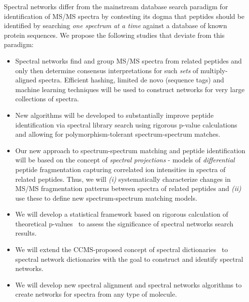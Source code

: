 \documentclass[arial,11pt]{article}
\begin{document}
Spectral networks differ from the mainstream database search paradigm for identification of MS/MS spectra by contesting its dogma that peptides should be identified by searching {\em one spectrum at a time} against a database of known protein sequences. We propose the following studies that deviate from this paradigm:
\begin{itemize}
%
\item Spectral networks find and group MS/MS spectra from related peptides and only then determine consensus interpretations for such {\em sets} of multiply-aligned spectra. Efficient hashing, limited de novo (sequence tags) and machine learning techniques will be used to construct networks for very large collections of spectra.
%
\item New algorithms will be developed to substantially improve peptide identification via spectral library search using rigorous p-value calculations and allowing for polymorphism-tolerant spectrum-spectrum matches.
%
\item Our  new approach to spectrum-spectrum matching and peptide identification will be based on the concept of {\em spectral projections} - models of {\em differential} peptide fragmentation capturing correlated ion intensities in spectra of related peptides. Thus, we will {\em(i)} systematically characterize changes in MS/MS fragmentation patterns between spectra of related peptides and {\em(ii)} use these to define new spectrum-spectrum matching models.
%
\item We will develop a statistical framework based on rigorous calculation of theoretical p-values~\cite{kim08,gupta11}  to assess the significance of spectral networks search results.
%
\item We will extend the CCMS-proposed concept of spectral dictionaries~\cite{kim09msdict} to spectral network dictionaries with the goal to construct and identify spectral networks.
%
\item We will develop new spectral alignment and spectral networks algorithms to create networks for spectra from any type of molecule.
\end{itemize}
\end{document}
